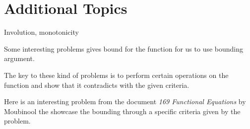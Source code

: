\documentclass[../../../main.tex]{subfiles}
\begin{document}
\section{Additional Topics}
Involution, monotonicity


Some interesting problems gives bound for the function for us to
use bounding argument.

\begin{important}
The key to these kind of problems is to perform certain operations on
the function and show that it contradicts with the given criteria.
\end{important}

Here is an interesting problem from the document
\textit{169 Functional Equations} by Moubinool the showcase the
bounding through a specific criteria given by the problem.
\end{document}

